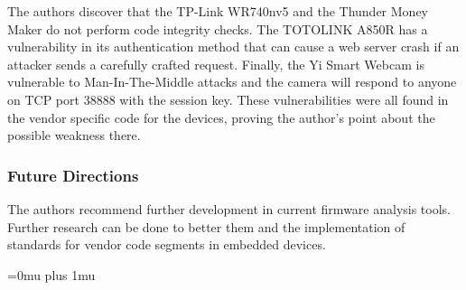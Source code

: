 \noindent
The authors discover that the TP-Link WR740nv5 and the Thunder Money Maker do not perform code integrity checks.  The TOTOLINK A850R has a vulnerability in its authentication method that can cause a web server crash if an attacker sends a carefully crafted request.  Finally, the Yi Smart Webcam is vulnerable to Man-In-The-Middle attacks and the camera will respond to anyone on TCP port 38888 with the session key.  These vulnerabilities were all found in the vendor specific code for the devices, proving the author's point about the possible weakness there.

\subsubsection{Future Directions}

\noindent
The authors recommend further development in current firmware analysis tools.  Further research can be done to better them and the implementation of standards for vendor code segments in embedded devices.

\Urlmuskip=0mu plus 1mu\relax
\pagebreak